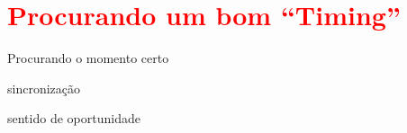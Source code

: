 
\section{\textcolor{red}{Procurando um bom ``Timing''}}
Procurando o momento certo

 sincronização 

 sentido de oportunidade 



